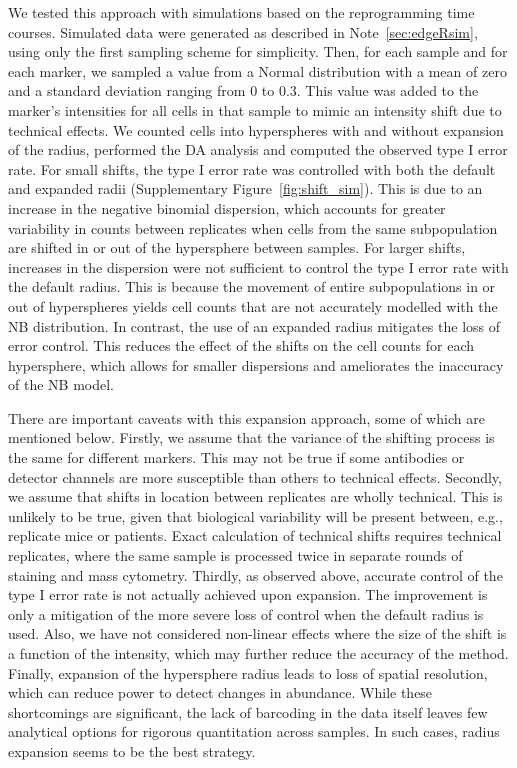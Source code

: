 \documentclass{article}
\begin{document}
We tested this approach with simulations based on the reprogramming time courses.
Simulated data were generated as described in Note~\ref{sec:edgeRsim}, using only the first sampling scheme for simplicity.
Then, for each sample and for each marker, we sampled a value from a Normal distribution with a mean of zero and a standard deviation ranging from 0 to 0.3.
This value was added to the marker's intensities for all cells in that sample to mimic an intensity shift due to technical effects.
We counted cells into hyperspheres with and without expansion of the radius, performed the DA analysis and computed the observed type I error rate.
For small shifts, the type I error rate was controlled with both the default and expanded radii (Supplementary Figure~\ref{fig:shift_sim}).
This is due to an increase in the negative binomial dispersion, which accounts for greater variability in counts between replicates when cells from the same subpopulation are shifted in or out of the hypersphere between samples. 
For larger shifts, increases in the dispersion were not sufficient to control the type I error rate with the default radius.
This is because the movement of entire subpopulations in or out of hyperspheres yields cell counts that are not accurately modelled with the NB distribution.
In contrast, the use of an expanded radius mitigates the loss of error control.
This reduces the effect of the shifts on the cell counts for each hypersphere, which allows for smaller dispersions and ameliorates the inaccuracy of the NB model.

There are important caveats with this expansion approach, some of which are mentioned below.
Firstly, we assume that the variance of the shifting process is the same for different markers.
This may not be true if some antibodies or detector channels are more susceptible than others to technical effects.
Secondly, we assume that shifts in location between replicates are wholly technical.
This is unlikely to be true, given that biological variability will be present between, e.g., replicate mice or patients.
Exact calculation of technical shifts requires technical replicates, where the same sample is processed twice in separate rounds of staining and mass cytometry.
Thirdly, as observed above, accurate control of the type I error rate is not actually achieved upon expansion.
The improvement is only a mitigation of the more severe loss of control when the default radius is used.
Also, we have not considered non-linear effects where the size of the shift is a function of the intensity, which may further reduce the accuracy of the method.
Finally, expansion of the hypersphere radius leads to loss of spatial resolution, which can reduce power to detect changes in abundance.
While these shortcomings are significant, the lack of barcoding in the data itself leaves few analytical options for rigorous quantitation across samples.
In such cases, radius expansion seems to be the best strategy.
\end{document}
